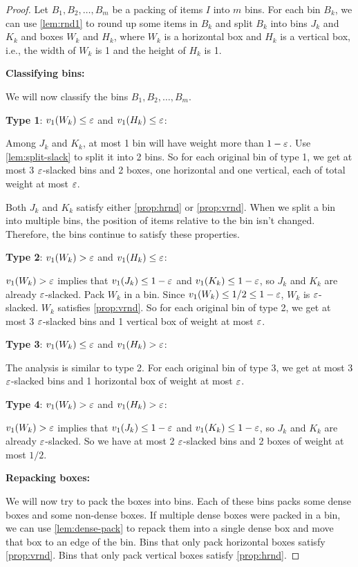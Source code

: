 \begin{proof}
Let $B_1, B_2, \ldots, B_m$ be a packing of items $I$ into $m$ bins.
For each bin $B_k$, we can use \cref{lem:rnd1} to round up some items in $B_k$
and split $B_k$ into bins $J_k$ and $K_k$ and boxes $W_k$ and $H_k$,
where $W_k$ is a horizontal box and $H_k$ is a vertical box,
i.e., the width of $W_k$ is 1 and the height of $H_k$ is 1.

\textbf{Classifying bins:}

We will now classify the bins $B_1, B_2, \ldots, B_m$.

\textbf{Type 1}: $v_1(W_k) \le \varepsilon$ and $v_1(H_k) \le \varepsilon$:

Among $J_k$ and $K_k$, at most 1 bin will have weight more than $1-\varepsilon$.
Use \cref{lem:split-slack} to split it into 2 bins.
So for each original bin of type 1, we get at most 3 $\varepsilon$-slacked bins and 2 boxes,
one horizontal and one vertical, each of total weight at most $\varepsilon$.

Both $J_k$ and $K_k$ satisfy either \cref{prop:hrnd} or \cref{prop:vrnd}.
When we split a bin into multiple bins, the position of items
relative to the bin isn't changed. Therefore, the bins continue to satisfy these properties.

\textbf{Type 2}: $v_1(W_k) > \varepsilon$ and $v_1(H_k) \le \varepsilon$:

$v_1(W_k) > \varepsilon$ implies that $v_1(J_k) \le 1-\varepsilon$ and $v_1(K_k) \le 1-\varepsilon$,
so $J_k$ and $K_k$ are already $\varepsilon$-slacked. Pack $W_k$ in a bin.
Since $v_1(W_k) \le 1/2 \le 1-\varepsilon$, $W_k$ is $\varepsilon$-slacked.
$W_k$ satisfies \cref{prop:vrnd}.
So for each original bin of type 2, we get at most 3 $\varepsilon$-slacked bins
and 1 vertical box of weight at most $\varepsilon$.

\textbf{Type 3}: $v_1(W_k) \le \varepsilon$ and $v_1(H_k) > \varepsilon$:

The analysis is similar to type 2.
For each original bin of type 3, we get at most 3 $\varepsilon$-slacked bins
and 1 horizontal box of weight at most $\varepsilon$.

\textbf{Type 4}: $v_1(W_k) > \varepsilon$ and $v_1(H_k) > \varepsilon$:

$v_1(W_k) > \varepsilon$ implies that $v_1(J_k) \le 1-\varepsilon$ and $v_1(K_k) \le 1-\varepsilon$,
so $J_k$ and $K_k$ are already $\varepsilon$-slacked.
So we have at most 2 $\varepsilon$-slacked bins and 2 boxes of weight at most $1/2$.

\textbf{Repacking boxes:}

We will now try to pack the boxes into bins.
Each of these bins packs some dense boxes and some non-dense boxes.
If multiple dense boxes were packed in a bin, we can use \cref{lem:dense-pack}
to repack them into a single dense box and move that box to an edge of the bin.
Bins that only pack horizontal boxes satisfy \cref{prop:vrnd}.
Bins that only pack vertical boxes satisfy \cref{prop:hrnd}.


\end{proof}

